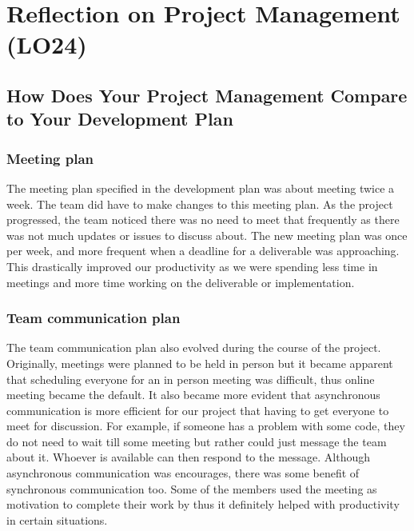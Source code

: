 \documentclass{article}
\begin{document}
	\section{Reflection on Project Management (LO24)}
	
	\subsection{How Does Your Project Management Compare to Your Development Plan}
	
	
	\subsubsection{Meeting plan}
	
	The meeting plan specified in the development plan was about meeting twice a week. The team did have to make changes to this meeting plan. As the project progressed, the team noticed there was no need to meet that frequently as there was not much updates or issues to discuss about. The new meeting plan was once per week, and more frequent when a deadline for a deliverable was approaching. This drastically improved our productivity as we were spending less time in meetings and more time working on the deliverable or implementation.
	
	\subsubsection{Team communication plan}
	
	The team communication plan also evolved during the course of the project. Originally, meetings were planned to be held in person but it became apparent that scheduling everyone for an in person meeting was difficult, thus online meeting became the default. It also became more evident that asynchronous communication is more efficient for our project that having to get everyone to meet for discussion. For example, if someone has a problem with some code, they do not need to wait till some meeting but rather could just message the team about it. Whoever is available can then respond to the message. Although asynchronous communication was encourages, there was some benefit of synchronous communication too. Some of the members used the meeting as motivation to complete their work by thus it definitely helped with productivity in certain situations.
	
\end{document}
